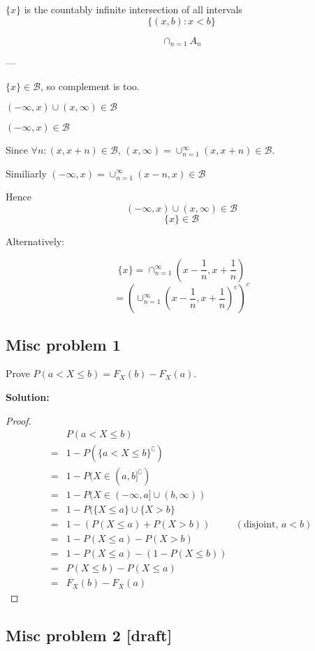 \documentclass{article}
\begin{document}
\(\{x\}\) is the countably infinite intersection of all intervals
\[\{(x,b):x<b\}\]

\[\cap_{n=1} A_n \]

---

\(\{x\} \in \mathcal{B}\), so complement is too.

\((-\infty,x)\cup (x,\infty)\in \mathcal{B}\)

\((-\infty,x)\in \mathcal{B}\)

Since \(\forall n: (x,x+n)\in \mathcal{B}\),
\((x,\infty)=\cup_{n=1}^\infty(x,x+n)\in \mathcal{B}\).

Similiarly
\((-\infty,x)=\cup_{n=1}^\infty (x-n,x)\in\mathcal{B}\)

Hence
\[(-\infty,x)\cup (x,\infty)\in \mathcal{B}\]
\[\{x\}\in \mathcal{B}\]

Alternatively:

\[\{x\} = \cap_{n=1}^{\infty} (x-\frac{1}{n}, x+\frac{1}{n})\]
\[= (\cup_{n=1}^{\infty} (x-\frac{1}{n}, x+\frac{1}{n})^c)^c\]

\subsection{Misc problem 1}

Prove \(P(a < X \leq b) = F_X(b)-F_X(a)\).

\textbf{Solution:}

\begin{proof}
\begin{align*}
     & P(a<X\leq b) \\
    =& 1-P(\{a<X\leq b\}^\complement) \\
    =& 1-P(X\in (a,b]^\complement) \\
    =& 1-P(X\in (-\infty,a] \cup (b,\infty)) \\
    =& 1-P(\{X\leq a\} \cup \{X>b\} \\
    =& 1-(P(X\leq a)+P(X>b)) & (\text{disjoint, }a<b) \\
    =& 1-P(X\leq a)-P(X>b) \\
    =& 1-P(X\leq a)-(1-P(X\leq b)) \\
    =& P(X\leq b)-P(X\leq a) \\
    =& F_X(b)-F_X(a)
\end{align*}
\end{proof}

\subsection{Misc problem 2 [draft]}
\end{document}

